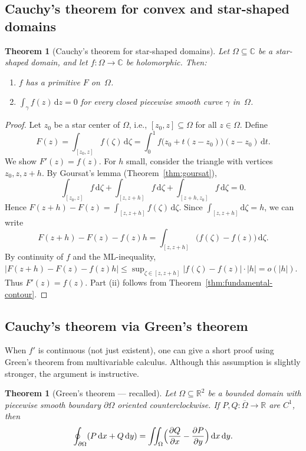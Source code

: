 \documentclass[12pt,a4paper,openany]{book}
\theoremstyle{definition}
\theoremstyle{plain}
\newtheorem{theorem}[definition]{Theorem}
\theoremstyle{remark}
\newcommand{\C}{\mathbb{C}}
\newcommand{\R}{\mathbb{R}}
\newcommand{\dd}{\mathrm{d}}
\newcommand{\abs}[1]{\left|#1\right|}
\begin{document}
\subsection{Cauchy's theorem for convex and star-shaped domains}

\begin{theorem}[Cauchy's theorem for star-shaped domains]%
\label{thm:cauchy-star-shaped}
Let $\Omega\subseteq\C$ be a star-shaped domain, and let $f\colon\Omega\to\C$
be holomorphic.  Then:
\begin{enumerate}[label=\textup{(\roman*)}]
  \item $f$ has a primitive $F$ on~$\Omega$.
  \item $\displaystyle\int_\gamma f(z)\,\dd z = 0$ for every closed
    piecewise smooth curve $\gamma$ in~$\Omega$.
\end{enumerate}
\end{theorem}

\begin{proof}
Let $z_0$ be a star center of $\Omega$, i.e., $[z_0,z]\subseteq\Omega$ for
all $z\in\Omega$.  Define
\[
  F(z) = \int_{[z_0,z]} f(\zeta)\,\dd\zeta
  = \int_0^1 f\bigl(z_0+t(z-z_0)\bigr)(z-z_0)\,\dd t.
\]
We show $F'(z)=f(z)$.  For $h$ small, consider the triangle with vertices
$z_0, z, z+h$.  By Goursat's lemma (Theorem~\ref{thm:goursat}),
\[
  \int_{[z_0,z]}f\,\dd\zeta + \int_{[z,z+h]}f\,\dd\zeta
  + \int_{[z+h,z_0]}f\,\dd\zeta = 0.
\]
Hence $F(z+h)-F(z) = \int_{[z,z+h]}f(\zeta)\,\dd\zeta$.  Since
$\int_{[z,z+h]}\dd\zeta = h$, we can write
\[
  F(z+h)-F(z)-f(z)h = \int_{[z,z+h]}\bigl(f(\zeta)-f(z)\bigr)\,\dd\zeta.
\]
By continuity of $f$ and the ML-inequality,
$\abs{F(z+h)-F(z)-f(z)h}\le\sup_{\zeta\in[z,z+h]}\abs{f(\zeta)-f(z)}\cdot\abs{h}
= o(\abs{h})$.  Thus $F'(z)=f(z)$.  Part (ii) follows from
Theorem~\ref{thm:fundamental-contour}.
\end{proof}

\subsection{Cauchy's theorem via Green's theorem}

When $f'$ is continuous (not just existent), one can give a short proof using
Green's theorem from multivariable calculus.  Although this assumption is
slightly stronger, the argument is instructive.

\begin{theorem}[Green's theorem --- recalled]\label{thm:green-recalled}
Let $\Omega\subseteq\R^2$ be a bounded domain with piecewise smooth boundary
$\partial\Omega$ oriented counterclockwise.  If $P,Q\colon\overline{\Omega}\to\R$
are $C^1$, then
\[
  \oint_{\partial\Omega}(P\,\dd x + Q\,\dd y)
  = \iint_\Omega\Bigl(\frac{\partial Q}{\partial x}
    - \frac{\partial P}{\partial y}\Bigr)\,\dd x\,\dd y.
\]
\end{theorem}
\end{document}
